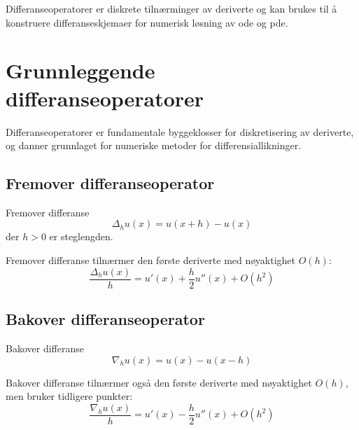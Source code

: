 Differanseoperatorer er diskrete tilnærminger av deriverte og kan brukes til å konstruere differanseskjemaer for numerisk løsning av \gls{ode} og \gls{pde}.

\section{Grunnleggende differanseoperatorer}

Differanseoperatorer er fundamentale byggeklosser for diskretisering av deriverte, og danner grunnlaget for numeriske metoder for differensiallikninger.

\subsection{Fremover differanseoperator}
\begin{definition}{Fremover differanse}{}
  \begin{equation}
    \Delta_h u(x) = u(x + h) - u(x) \label{eq:forward_diff}
  \end{equation}
  der $h > 0$ er steglengden.
\end{definition}

\begin{remark*}{}{}
  Fremover differanse tilnærmer den første deriverte med nøyaktighet $O(h)$:
  \begin{equation}
    \frac{\Delta_h u(x)}{h} = u'(x) + \frac{h}{2}u''(x) + O(h^2)
  \end{equation}
\end{remark*}

\subsection{Bakover differanseoperator}
\begin{definition}{Bakover differanse}{}
  \begin{equation}
    \nabla_h u(x) = u(x) - u(x - h) \label{eq:backward_diff}
  \end{equation}
\end{definition}

\begin{remark*}{}{}
  Bakover differanse tilnærmer også den første deriverte med nøyaktighet $O(h)$, men bruker tidligere punkter:
  \begin{equation}
    \frac{\nabla_h u(x)}{h} = u'(x) - \frac{h}{2}u''(x) + O(h^2)
  \end{equation}
\end{remark*}

